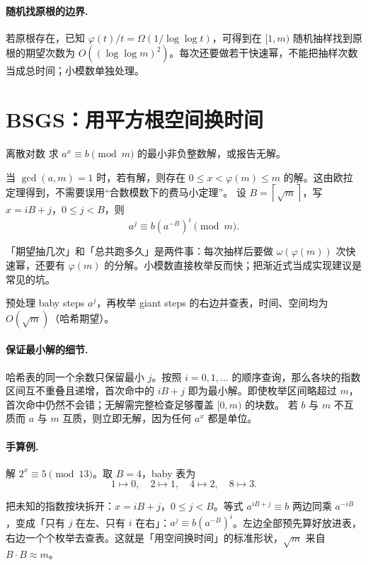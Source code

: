 \documentclass[UTF8,a4paper,11pt,oneside,openany,fontset=fandol]{ctexbook}
\theoremstyle{definition}
\newcommand{\ceil}[1]{\left\lceil #1\right\rceil}
\begin{document}
\paragraph{随机找原根的边界.} 若原根存在，已知 $\varphi(t)/t=\Omega(1/\log\log t)$，可得到在 $[1,m)$ 随机抽样找到原根的期望次数为 $O((\log\log m)^2)$。每次还要做若干快速幂，不能把抽样次数当成总时间；小模数单独处理。


\section{BSGS：用平方根空间换时间}
\begin{problem}{离散对数}
求 $a^x\equiv b\pmod m$ 的最小非负整数解，或报告无解。
\end{problem}
当 $\gcd(a,m)=1$ 时，若有解，则存在 $0\le x<\varphi(m)\le m$ 的解。这由欧拉定理得到，不需要误用“合数模数下的费马小定理”。
设 $B=\ceil{\sqrt m}$，写 $x=iB+j$，$0\le j<B$，则
\[
 a^j\equiv b(a^{-B})^i\pmod m.
\]

\begin{tip}
「期望抽几次」和「总共跑多久」是两件事：每次抽样后要做 $\omega(\varphi(m))$ 次快速幂，还要有 $\varphi(m)$ 的分解。小模数直接枚举反而快；把渐近式当成实现建议是常见的坑。
\end{tip}

预处理 baby steps $a^j$，再枚举 giant steps 的右边并查表，时间、空间均为 $O(\sqrt m)$（哈希期望）。


\paragraph{保证最小解的细节.}
哈希表的同一个余数只保留最小 $j$。按照 $i=0,1,\ldots$ 的顺序查询，那么各块的指数区间互不重叠且递增，首次命中的 $iB+j$ 即为最小解。即使枚举区间略超过 $m$，首次命中仍然不会错；无解需完整检查足够覆盖 $[0,m)$ 的块数。
若 $b$ 与 $m$ 不互质而 $a$ 与 $m$ 互质，则立即无解，因为任何 $a^x$ 都是单位。

\paragraph{手算例.} 解 $2^x\equiv5\pmod{13}$。取 $B=4$，baby 表为
\[
1\mapsto0,\quad2\mapsto1,\quad4\mapsto2,\quad8\mapsto3.
\]

\begin{tip}
把未知的指数按块拆开：$x=iB+j$，$0\le j<B$。等式 $a^{iB+j}\equiv b$ 两边同乘 $a^{-iB}$，变成「只有 $j$ 在左、只有 $i$ 在右」：$a^j\equiv b(a^{-B})^i$。左边全部预先算好放进表，右边一个个枚举去查表。这就是「用空间换时间」的标准形状，$\sqrt m$ 来自 $B\cdot B\approx m$。
\end{tip}
\end{document}
